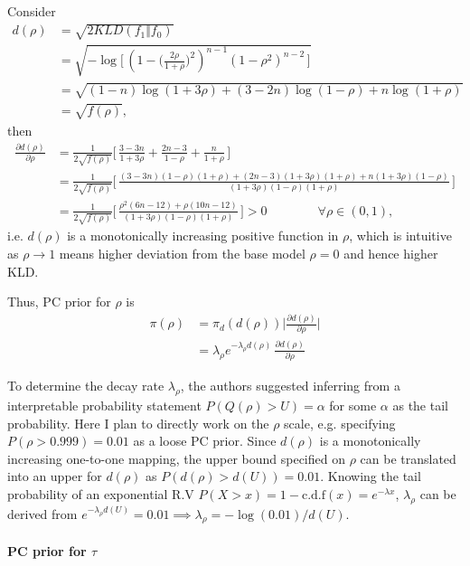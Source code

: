 \documentclass[12pt,a4paper]{article}
\begin{document}
Consider 
\begin{align*}
d(\rho) &= \sqrt{2 KLD(f_1 \Vert f_0)} \\
&= \sqrt{- \log \big[ \, (1- \big(\frac{2\rho}{1+\rho}\big)^2 )^{n-1} (1-\rho^2)^{n-2}\, \big]} \tag{1}\\
&= \sqrt{(1-n) \log(1+3\rho) + (3-2n) \log(1-\rho) + n \log(1+\rho)}\\
&= \sqrt{f(\rho)},
\end{align*}
then 
\begin{align*}
\frac{\partial d(\rho)}{\partial\rho} &= \frac{1}{2\sqrt{f(\rho)}} \Big[\, \frac{3-3n}{1+3\rho} + \frac{2n-3}{1-\rho} + \frac{n}{1+\rho} \,\Big] \\
&= \frac{1}{2\sqrt{f(\rho)}} \Big[\, \frac{(3-3n)(1-\rho)(1+\rho) + (2n-3)(1+3\rho)(1+\rho) + n(1+3\rho)(1-\rho)}{(1+3\rho)(1-\rho)(1+\rho)}   \,\Big] \\
&= \frac{1}{2\sqrt{f(\rho)}} \Big[\, \frac{\rho^2(6n-12) + \rho(10n - 12)}{(1+3\rho)(1-\rho)(1+\rho)}\,\Big] > 0 \qquad \qquad \forall \rho \in (0, 1),
\end{align*}
i.e. $d(\rho)$ is a monotonically increasing positive function in $\rho$, which is intuitive as $\rho \to 1$ means higher deviation from the base model $\rho = 0$ and hence higher KLD. 

Thus, PC prior for $\rho$ is
\begin{align*}
\pi(\rho) &= \pi_{d}(d(\rho)) \Big \vert \frac{\partial d(\rho)}{\partial\rho} \Big \vert \\
&= \lambda_{\rho} e^{-\lambda_{\rho} d(\rho)} \, \frac{\partial d(\rho)}{\partial \rho}
\end{align*}

To determine the decay rate $\lambda_{\rho}$, the authors suggested inferring from a interpretable probability statement $P(Q(\rho) > U) = \alpha$ for some $\alpha$ as the tail probability. Here I plan to directly work on the $\rho$ scale, e.g. specifying $P(\rho > 0.999) = 0.01$ as a loose PC prior. Since $d(\rho)$ is a monotonically increasing one-to-one mapping, the upper bound specified on $\rho$ can be translated into an upper for $d(\rho)$ as $P(d(\rho) > d(U)) = 0.01$. Knowing the tail probability of an exponential R.V $P(X > x) = 1 - \text{c.d.f}(x) = e^{-\lambda x}$, $\lambda_\rho$ can be derived from $e^{-\lambda_{\rho} d(U)} = 0.01 \implies \lambda_\rho = -\log(0.01) / d(U)$.

\paragraph{PC prior for $\tau$} \\~\\
\end{document}
